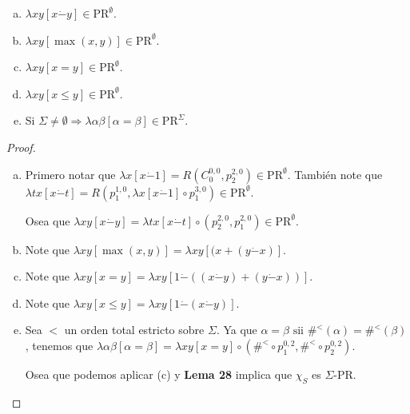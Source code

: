   \begin{lemma}
    \begin{enumerate}[a)]
      \item $\lambda xy \left[x \dot{-}y\right] \in \mathrm{PR}^{\emptyset}$.
      \item $\lambda xy \left[\max (x,y)\right] \in \mathrm{PR}^{\emptyset}$.
      \item $\lambda xy \left[x=y\right] \in \mathrm{PR}^{\emptyset}$.
      \item $\lambda xy \left[x \leq y\right] \in \mathrm{PR}^{\emptyset}$.
      \item Si $\Sigma \neq \emptyset \Rightarrow \lambda \alpha \beta \left[\alpha = \beta\right] \in
        \mathrm{PR}^{\Sigma}$.
    \end{enumerate}
  \end{lemma}
  \begin{proof}
    \begin{enumerate}[a)]
      \item Primero notar que $\lambda x \left[x \dot{-}1\right] = R(C_{0}^{0, 0}, p_{2}^{2, 0}) \in
        \mathrm{PR}^{\emptyset}$. También note que $\lambda tx \left[x \dot{-}t\right] = R(p_{1}^{1, 0}, \lambda x
        \left[x \dot{-}1\right] \circ p_{1}^{3, 0}) \in \mathrm{PR}^{\emptyset}$.

        \par Osea que $\lambda xy \left[x \dot{-}y\right] = \lambda tx \left[x \dot{-}t\right] \circ (p_{2}^{2, 0},
        p_{1}^{2, 0}) \in \mathrm{PR}^{\emptyset}$.
      \item Note que $\lambda xy \left[\max (x,y)\right] = \lambda xy \left[(x + (y \dot{-}x)\right]$.
      \item Note que $\lambda xy \left[x = y\right] = \lambda xy \left[1 \dot{-}((x \dot{-} y) + (y \dot{-} x))\right]$.
      \item Note que $\lambda xy \left[x \leq y\right] = \lambda xy\left[1 \dot{-}(x \dot{-}y)\right]$.
      \item Sea $<$ un orden total estricto sobre $\Sigma$. Ya que $\alpha = \beta \text{ sii } \#^{<}(\alpha) =
        \#^{<}(\beta)$, tenemos que $\lambda \alpha \beta \left[\alpha = \beta\right] = \lambda xy \left[x = y\right]
        \circ (\#^{<} \circ p_{1}^{0, 2}, \#^{<} \circ p_{2}^{0, 2})$.

        \par Osea que podemos aplicar (c) y \textbf{Lema 28} implica que $\chi_{S}$ es $\Sigma$-PR.
    \end{enumerate}
  \end{proof}

